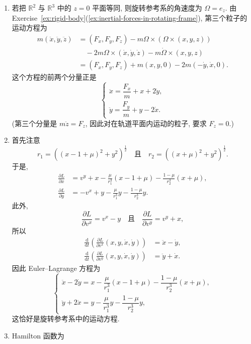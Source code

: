 \begin{description}[font=\normalfont,leftmargin=2em,labelwidth=1.5em]
\begin{enumerate}[label=(\alph*),ref=\alph*,leftmargin=*]
\item 若把 $\mathbb{R}^2$ 与 $\mathbb{R}^3$ 中的 $z=0$ 平面等同, 则旋转参考系的角速度为 $\Omega=e_z$. 由 Exercise~\ref{ex:rigid-body}(\ref{ex:inertial-forces-in-rotating-frame}), 第三个粒子的运动方程为
\begin{align*}
  m(\ddot x,\ddot y,\ddot z)
  &=(F_x,F_y,F_z)-m\Omega\times(\Omega\times(x,y,z))\\
  &\quad-2m\Omega\times(\dot x,\dot y,\dot z)-m\dot\Omega\times(x,y,z)\\
  &=(F_x,F_y,F_z)+m(x,y,0)-2m(-\dot y,\dot x,0).
\end{align*}
这个方程的前两个分量正是
\[
  \begin{cases}
   \ddot x=\dfrac{F_x}{m}+x+2\dot y,\\[3pt]
   \ddot y=\dfrac{F_y}{m}+y-2\dot x.
  \end{cases}
\]
(第三个分量是 $m\ddot z=F_z$, 因此对在轨道平面内运动的粒子, 要求 $F_z=0$.)
\item 首先注意
\[
  r_1=((x-1+\mu)^2+y^2)^{\frac12}
  \quad\text{且}\quad r_2=((x+\mu)^2+y^2)^{\frac12}.
\]
于是,
\begin{align*}
  \frac{\partial L}{\partial x}&=v^y+x-\frac{\mu}{r_1^3}(x-1+\mu)-\frac{1-\mu}{r_2^3}(x+\mu),\\
  \frac{\partial L}{\partial y}&=-v^x+y-\frac{\mu}{r_1^3}y-\frac{1-\mu}{r_2^3}y.
\end{align*}
此外,
\[
  \frac{\partial L}{\partial v^x}=v^x-y
   \quad\text{且}\quad\frac{\partial L}{\partial v^y}=v^y+x,
\]
所以
\begin{align*}
  \frac{\mathrm{d}}{\mathrm{d}t}
    \left(\frac{\partial L}{\partial v^x}(x,y,\dot x,\dot y)\right)&=\ddot x-\dot y,\\
  \frac{\mathrm{d}}{\mathrm{d}t}
    \left(\frac{\partial L}{\partial v^y}(x,y,\dot x,\dot y)\right)&=\ddot y+\dot x.
\end{align*}
因此 Euler–Lagrange 方程为
\[
  \begin{cases}
   \ddot x-2\dot y=x-\dfrac{\mu}{r_1^3}(x-1+\mu)-\dfrac{1-\mu}{r_2^3}(x+\mu),\\[3pt]
   \ddot y+2\dot x=y-\dfrac{\mu}{r_1^3}y-\dfrac{1-\mu}{r_2^3}y,
  \end{cases}
\]
这恰好是旋转参考系中的运动方程.
\item Hamilton 函数为
\begin{align*}

\end{align*}
\end{enumerate}
\end{description}
